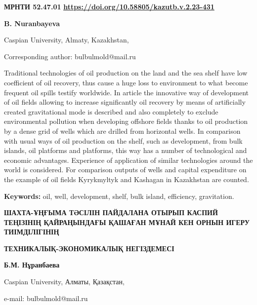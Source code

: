 \newpage
{}
{\bfseries МРНТИ 52.47.01}
\hfill {\bfseries \href{https://doi.org/10.58805/kazutb.v.2.23-431}{https://doi.org/10.58805/kazutb.v.2.23-431}}


\begin{center}
{\bfseries B. Nuranbayeva}

Caspian University, Almaty, Kazakhstan,

\envelope Corresponding author: bulbulmold@mail.ru
\end{center}

Traditional technologies of oil production on the land and the sea shelf
have low coefficient of oil recovery, thus cause a huge loss to
environment to what become frequent oil spills testify worldwide. In
article the innovative way of development of oil fields allowing to
increase significantly oil recovery by means of artificially created
gravitational mode is described and also completely to exclude
environmental pollution when developing offshore fields thanks to oil
production by a dense grid of wells which are drilled from horizontal
wells. In comparison with usual ways of oil production on the shelf,
such as development, from bulk islands, oil platforms and platforms,
this way has a number of technological and economic advantages.
Experience of application of similar technologies around the world is
considered. For comparison outputs of wells and capital expenditure on
the example of oil fields Kyrykmyltyk and Kashagan in Kazakhstan are
counted.

{\bfseries Keywords:} oil, well, development, shelf, bulk island,
efficiency, gravitation.

\begin{center}
{\large\bfseries ШАХТА-ҰҢҒЫМА ТӘСІЛІН ПАЙДАЛАНА ОТЫРЫП КАСПИЙ ТЕҢІЗІНІҢ
ҚАЙРАҢЫНДАҒЫ ҚАШАҒАН МҰНАЙ КЕН ОРНЫН ИГЕРУ ТИІМДІЛІГІНІҢ}

{\bfseries ТЕХНИКАЛЫҚ-ЭКОНОМИКАЛЫҚ НЕГІЗДЕМЕСІ}

{\bfseries Б.М. Нұранбаева}

Caspian University, Алматы, Қазақстан,

e-mail: bulbulmold@mail.ru
\end{center}

